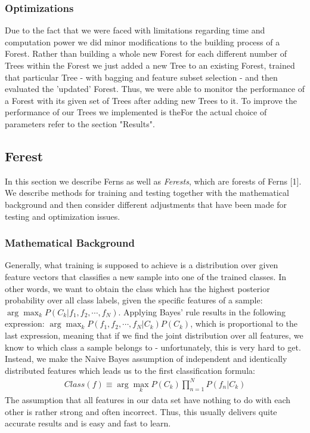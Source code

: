 \documentclass[twocolumn]{article}
\begin{document}
\subsubsection{Optimizations}
Due to the fact that we were faced with limitations regarding time and computation power we did minor modifications to the building process of a Forest. Rather than building a whole new Forest for each different number of Trees within the Forest we just added a new Tree to an existing Forest, trained that particular Tree - with bagging and feature subset selection - and then evaluated the 'updated' Forest. Thus, we were able to monitor the performance of a Forest with its given set of Trees after adding new Trees to it. To improve the performance of our Trees we implemented  is theFor the actual choice of parameters refer to the section "Results".


\subsection{Ferest}

In this section we describe Ferns as well as \textit{Ferests}, which are forests of Ferns [1]. We describe methods for training and testing together with the mathematical background and then consider different adjustments that have been made for testing and optimization issues.\\

\subsubsection{Mathematical Background}

Generally, what training is supposed to achieve is a distribution over given feature vectors that classifies a new sample into one of the trained classes. In other words, we want to obtain the class which has the highest posterior probability over all class labels, given the specific features of a sample: $\arg\max_k P(C_k \vert f_1,f_2, \cdots ,f_N)$. Applying Bayes' rule results in the following expression: $\arg\max_k P(f_1,f_2, \cdots ,f_N \vert C_k)P(C_k)$, which is proportional to the last expression, meaning that if we find the joint distribution over all features, we know to which class a sample belongs to - unfortunately, this is very hard to get. Instead, we make the Naive Bayes assumption of independent and identically distributed features which leads us to the first classification formula:
\begin{align*}
Class(f) \equiv \arg\max_k P(C_k) \prod_{n=1}^N P(f_n\vert C_k)
\end{align*}
The assumption that all features in our data set have nothing to do with each other is rather strong and often incorrect. Thus, this usually delivers quite accurate results and is easy and fast to learn.
\end{document}
